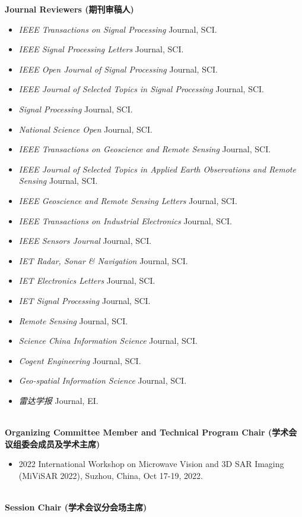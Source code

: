 \documentclass[paper=a4,fontsize=11pt]{scrartcl}
\begin{document}
\textbf{Journal Reviewers (期刊审稿人)} 
\begin{itemize}
	\item \textit{IEEE Transactions on Signal Processing} Journal, SCI.
	\item \textit{IEEE Signal Processing Letters} Journal, SCI.
	\item \textit{IEEE Open Journal of Signal Processing} Journal, SCI.
	\item \textit{IEEE Journal of Selected Topics in Signal Processing} Journal, SCI.
	\item \textit{Signal Processing} Journal, SCI.
	\item \textit{National Science Open} Journal, SCI.
	\item \textit{IEEE Transactions on Geoscience and Remote Sensing} Journal, SCI.
	\item \textit{IEEE Journal of Selected Topics in Applied Earth Observations and Remote Sensing} Journal, SCI.
	\item \textit{IEEE Geoscience and Remote Sensing Letters} Journal, SCI.
	\item \textit{IEEE Transactions on Industrial Electronics} Journal, SCI.
	\item \textit{IEEE Sensors Journal} Journal, SCI.
	\item \textit{IET Radar, Sonar \& Navigation} Journal, SCI.
	\item \textit{IET Electronics Letters} Journal, SCI.
	\item \textit{IET Signal Processing} Journal, SCI.
	\item \textit{Remote Sensing} Journal, SCI.
	\item \textit{Science China Information Science} Journal, SCI.
	\item \textit{Cogent Engineering} Journal, SCI.
	\item \textit{Geo-spatial Information Science} Journal, SCI.
	\item \textit{雷达学报} Journal, EI.
\end{itemize}
~\\
\textbf{Organizing Committee Member and Technical Program Chair (学术会议组委会成员及学术主席)} 
\begin{itemize}
	\item 2022 International Workshop on Microwave Vision and 3D SAR Imaging (MiViSAR 2022), Suzhou, China, Oct 17-19, 2022.
\end{itemize}
~\\
\textbf{Session Chair (学术会议分会场主席)} 
\end{document}
